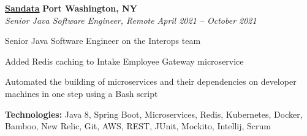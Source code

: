 %
    \headerrow
        {\textbf{\href{https://www.sandata.com/}{Sandata}}}
        {\textbf{Port Washington, NY}}
    \\
    \headerrow
        {\emph{Senior Java Software Engineer, Remote}}
        {\emph{April 2021 -- October 2021}}
    \begin{itemize*}
        \item Senior Java Software Engineer on the Interops team
        \item Added Redis caching to Intake Employee Gateway microservice
        \item Automated the building of microservices and their dependencies on developer machines in one step using a Bash script
    \end{itemize*}

    \hspace{1.0em}
        {\textbf{Technologies:} Java 8, Spring Boot, Microservices, Redis, Kubernetes, Docker, Bamboo, New Relic,
        Git, AWS, REST, JUnit, Mockito, Intellij, Scrum}

